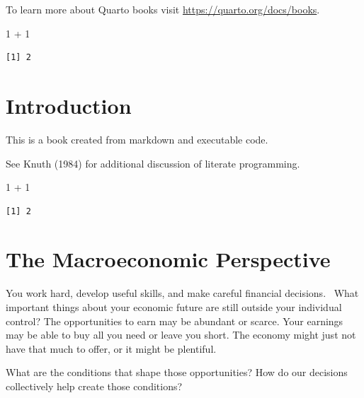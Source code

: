 \documentclass[
  letterpaper,
  DIV=11,
  numbers=noendperiod]{scrreprt}
\newenvironment{Shaded}{\begin{snugshade}}{\end{snugshade}}
\newcommand{\DecValTok}[1]{\textcolor[rgb]{0.68,0.00,0.00}{#1}}
\newcommand{\SpecialCharTok}[1]{\textcolor[rgb]{0.37,0.37,0.37}{#1}}
\begin{document}
To learn more about Quarto books visit
\url{https://quarto.org/docs/books}.

\begin{Shaded}
\begin{Highlighting}[]
\DecValTok{1} \SpecialCharTok{+} \DecValTok{1}
\end{Highlighting}
\end{Shaded}

\begin{verbatim}
[1] 2
\end{verbatim}


\chapter*{Introduction}\label{introduction}


This is a book created from markdown and executable code.

See Knuth (1984) for additional discussion of literate programming.

\begin{Shaded}
\begin{Highlighting}[]
\DecValTok{1} \SpecialCharTok{+} \DecValTok{1}
\end{Highlighting}
\end{Shaded}

\begin{verbatim}
[1] 2
\end{verbatim}


\chapter{The Macroeconomic
Perspective}\label{the-macroeconomic-perspective}

You work hard, develop useful skills, and make careful financial
decisions.~ What important things about your economic future are still
outside your individual control? The opportunities to earn may be
abundant or scarce. Your earnings may be able to buy all you need or
leave you short. The economy might just not have that much to offer, or
it might be plentiful.

What are the conditions that shape those opportunities? How do our
decisions collectively help create those conditions?
\end{document}
